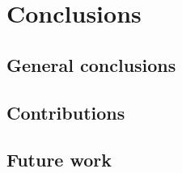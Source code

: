 
    \chapter{Conclusions}
    \label{conclus}

    \section{General conclusions}
	
    
     
    \section{Contributions}
	
	

    \section{Future work}
    
